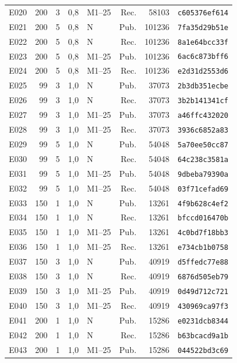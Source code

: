 \begin{longtable}{lrrrlrrl}
E020 & 200 & 3 & 0,8 & M1--25 & Rec. & 58103 & \texttt{c605376ef614} \\
E021 & 200 & 5 & 0,8 & N & Pub. & 101236 & \texttt{7fa35d29b51e} \\
E022 & 200 & 5 & 0,8 & N & Rec. & 101236 & \texttt{8a1e64bcc33f} \\
E023 & 200 & 5 & 0,8 & M1--25 & Pub. & 101236 & \texttt{6ac6c873bff6} \\
E024 & 200 & 5 & 0,8 & M1--25 & Rec. & 101236 & \texttt{e2d31d2553d6} \\
E025 & 99 & 3 & 1,0 & N & Pub. & 37073 & \texttt{2b3db351ecbe} \\
E026 & 99 & 3 & 1,0 & N & Rec. & 37073 & \texttt{3b2b141341cf} \\
E027 & 99 & 3 & 1,0 & M1--25 & Pub. & 37073 & \texttt{a46ffc432020} \\
E028 & 99 & 3 & 1,0 & M1--25 & Rec. & 37073 & \texttt{3936c6852a83} \\
E029 & 99 & 5 & 1,0 & N & Pub. & 54048 & \texttt{5a70ee50cc87} \\
E030 & 99 & 5 & 1,0 & N & Rec. & 54048 & \texttt{64c238c3581a} \\
E031 & 99 & 5 & 1,0 & M1--25 & Pub. & 54048 & \texttt{9dbeba79390a} \\
E032 & 99 & 5 & 1,0 & M1--25 & Rec. & 54048 & \texttt{03f71cefad69} \\
E033 & 150 & 1 & 1,0 & N & Pub. & 13261 & \texttt{4f9b628c4ef2} \\
E034 & 150 & 1 & 1,0 & N & Rec. & 13261 & \texttt{bfccd016470b} \\
E035 & 150 & 1 & 1,0 & M1--25 & Pub. & 13261 & \texttt{4c0bd7f18bb3} \\
E036 & 150 & 1 & 1,0 & M1--25 & Rec. & 13261 & \texttt{e734cb1b0758} \\
E037 & 150 & 3 & 1,0 & N & Pub. & 40919 & \texttt{d5ffedc77e88} \\
E038 & 150 & 3 & 1,0 & N & Rec. & 40919 & \texttt{6876d505eb79} \\
E039 & 150 & 3 & 1,0 & M1--25 & Pub. & 40919 & \texttt{0d49d712c721} \\
E040 & 150 & 3 & 1,0 & M1--25 & Rec. & 40919 & \texttt{430969ca97f3} \\
E041 & 200 & 1 & 1,0 & N & Pub. & 15286 & \texttt{e0231dcb8344} \\
E042 & 200 & 1 & 1,0 & N & Rec. & 15286 & \texttt{b63bcacd9a1b} \\
E043 & 200 & 1 & 1,0 & M1--25 & Pub. & 15286 & \texttt{044522bd3c69} \\

\end{longtable}
